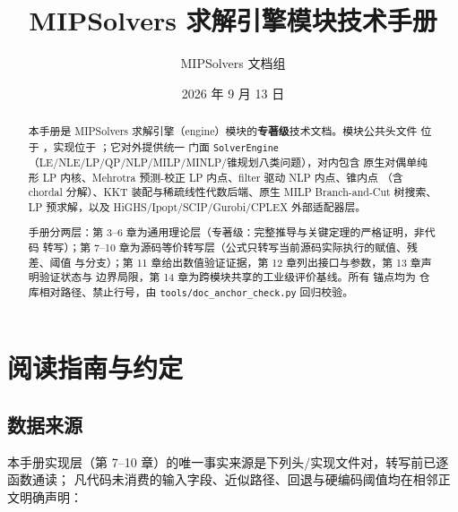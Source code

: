 \documentclass{ctexart}
\title{MIPSolvers 求解引擎模块技术手册}
\author{MIPSolvers 文档组}
\date{2026 年 9 月 13 日}
\begin{document}
\maketitle

\begin{abstract}
本手册是 MIPSolvers 求解引擎（engine）模块的\textbf{专著级}技术文档。模块公共头文件
位于 ，实现位于 ；它对外提供统一
门面 \texttt{SolverEngine}（LE/NLE/LP/QP/NLP/MILP/MINLP/锥规划八类问题），对内包含
原生对偶单纯形 LP 内核、Mehrotra 预测-校正 LP 内点、filter 驱动 NLP 内点、锥内点
（含 chordal 分解）、KKT 装配与稀疏线性代数后端、原生 MILP Branch-and-Cut 树搜索、
LP 预求解，以及 HiGHS/Ipopt/SCIP/Gurobi/CPLEX 外部适配器层。

手册分两层：第 3--6 章为通用理论层（专著级：完整推导与关键定理的严格证明，非代码
转写）；第 7--10 章为源码等价转写层（公式只转写当前源码实际执行的赋值、残差、阈值
与分支）；第 11 章给出数值验证证据，第 12 章列出接口与参数，第 13 章声明验证状态与
边界局限，第 14 章为跨模块共享的工业级评价基线。所有  锚点均为
仓库相对路径、禁止行号，由 \texttt{tools/doc\_anchor\_check.py} 回归校验。
\end{abstract}

\tableofcontents
\newpage

\section{阅读指南与约定}

\subsection{数据来源}

本手册实现层（第 7--10 章）的唯一事实来源是下列头/实现文件对，转写前已逐函数通读；
凡代码未消费的输入字段、近似路径、回退与硬编码阈值均在相邻正文明确声明：
\end{document}
